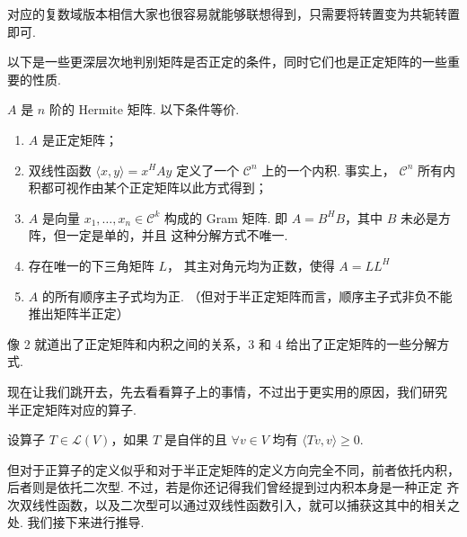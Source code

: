 对应的复数域版本相信大家也很容易就能够联想得到，只需要将转置变为共轭转置即可. 

以下是一些更深层次地判别矩阵是否正定的条件，同时它们也是正定矩阵的一些重要的性质. 

\begin{theorem}
    $ A $ 是 $ n $ 阶的 Hermite 矩阵. 以下条件等价. 
    \begin{enumerate}
        \item $ A $ 是正定矩阵；
        
        \item 双线性函数 $ \langle x, y \rangle = x^{H}Ay $ 
        定义了一个 $ \mathcal{C}^{n} $ 上的一个内积.
        事实上， $ \mathcal{C}^{n} $ 所有内积都可视作由某个正定矩阵以此方式得到；

        \item $ A $ 是向量 $ x_1, \ldots , x_n \in \mathcal{C}^{k} $ 构成的
        Gram 矩阵. 即 $ A = B^{H}B $，其中 $ B $ 未必是方阵，但一定是单的，并且
        这种分解方式不唯一.  
        
        \item {} 存在唯一的下三角矩阵 $ L $，
        其主对角元均为正数，使得 $ A = LL^{H} $

        \item {} $ A $ 的所有顺序主子式均为正.
        （但对于半正定矩阵而言，顺序主子式非负不能推出矩阵半正定）
    \end{enumerate}
\end{theorem} 

像 2 就道出了正定矩阵和内积之间的关系，3 和 4 给出了正定矩阵的一些分解方式. 

现在让我们跳开去，先去看看算子上的事情，不过出于更实用的原因，我们研究
半正定矩阵对应的算子. 

\begin{definition}
    设算子 $ T \in \mathcal{L}(V) $，如果 $ T $ 是自伴的且 $ \forall v \in V $
    均有 $ \langle Tv, v \rangle \geqslant 0 $. 
\end{definition}

但对于正算子的定义似乎和对于半正定矩阵的定义方向完全不同，前者依托内积，
后者则是依托二次型. 不过，若是你还记得我们曾经提到过内积本身是一种正定
齐次双线性函数，以及二次型可以通过双线性函数引入，就可以捕获这其中的相关之处. 
我们接下来进行推导. 

